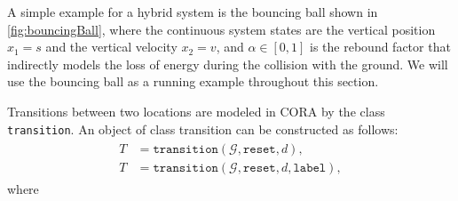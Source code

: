 A simple example for a hybrid system is the bouncing ball shown in \cref{fig:bouncingBall}, where the continuous system states are the vertical position $x_1 = s$ and the vertical velocity $x_2 = v$, and $\alpha \in [0,1]$ is the rebound factor that indirectly models the loss of energy during the collision with the ground. We will use the bouncing ball as a running example throughout this section.

\vspace{0.2cm}

Transitions between two locations are modeled in CORA by the class \texttt{transition}. An object of class transition can be constructed as follows:
\begin{align}
    \begin{split}
        \label{eq:transition}
        T &= \texttt{transition}(\mathcal{G},\texttt{reset},d), \\
        T &= \texttt{transition}(\mathcal{G},\texttt{reset},d,\texttt{label}),
    \end{split}
\end{align}
where
